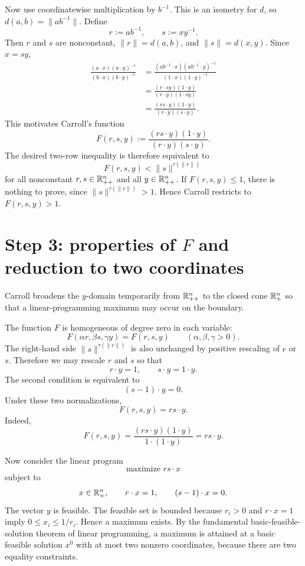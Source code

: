 Now use coordinatewise multiplication by $b^{-1}$.  This is an isometry for $d$, so
$d(a,b)=\|ab^{-1}\|$.  Define
\[
  r:=ab^{-1},
  \qquad
  s:=xy^{-1}.
\]
Then $r$ and $s$ are nonconstant, $\|r\|=d(a,b)$, and $\|s\|=d(x,y)$.  Since
$x=sy$,
\begin{align*}
  \frac{(a\cdot x)(a\cdot y)^{-1}}{(b\cdot x)(b\cdot y)^{-1}}
  &=\frac{(ab^{-1}\cdot x)(ab^{-1}\cdot y)^{-1}}
          {(1\cdot x)(1\cdot y)^{-1}}\\
  &=\frac{(r\cdot sy)(1\cdot y)}{(r\cdot y)(1\cdot sy)}\\
  &=\frac{(rs\cdot y)(1\cdot y)}{(r\cdot y)(s\cdot y)}.
\end{align*}
This motivates Carroll's function
\[
  F(r,s,y):=\frac{(rs\cdot y)(1\cdot y)}{(r\cdot y)(s\cdot y)}.
\]
The desired two-row inequality is therefore equivalent to
\[
  F(r,s,y)<\|s\|^{\tau(\|r\|)}
\]
for all nonconstant $r,s\in\mathbb{R}^n_{++}$ and all $y\in\mathbb{R}^n_{++}$.  If $F(r,s,y)\le1$,
there is nothing to prove, since $\|s\|^{\tau(\|r\|)}>1$.  Hence Carroll restricts to
$F(r,s,y)>1$.

\section*{Step 3: properties of $F$ and reduction to two coordinates}
Carroll broadens the $y$-domain temporarily from $\mathbb{R}^n_{++}$ to the closed cone
$\mathbb{R}^n_+$ so that a linear-programming maximum may occur on the boundary.

The function $F$ is homogeneous of degree zero in each variable:
\[
  F(\alpha r,\beta s,\gamma y)=F(r,s,y)
  \qquad(\alpha,\beta,\gamma>0).
\]
The right-hand side $\|s\|^{\tau(\|r\|)}$ is also unchanged by positive rescaling of
$r$ or $s$.  Therefore we may rescale $r$ and $s$ so that
\[
  r\cdot y=1,
  \qquad
  s\cdot y=1\cdot y.
\]
The second condition is equivalent to
\[
  (s-1)\cdot y=0.
\]
Under these two normalizations,
\[
  F(r,s,y)=rs\cdot y.
\]
Indeed,
\[
  F(r,s,y)=\frac{(rs\cdot y)(1\cdot y)}{1\cdot(1\cdot y)}=rs\cdot y.
\]

Now consider the linear program
\[
  \text{maximize } rs\cdot x
\]
subject to
\[
  x\in\mathbb{R}^n_+,
  \qquad
  r\cdot x=1,
  \qquad
  (s-1)\cdot x=0.
\]
The vector $y$ is feasible.  The feasible set is bounded because $r_i>0$ and
$r\cdot x=1$ imply $0\le x_i\le 1/r_i$.  Hence a maximum exists.  By the fundamental
basic-feasible-solution theorem of linear programming, a maximum is attained at a
basic feasible solution $x^0$ with at most two nonzero coordinates, because there are
two equality constraints.

